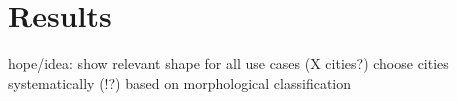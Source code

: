 \section{Results}
\label{sec:results}

hope/idea: show relevant shape for all use cases (X cities?)
choose cities systematically (!?) based on morphological classification